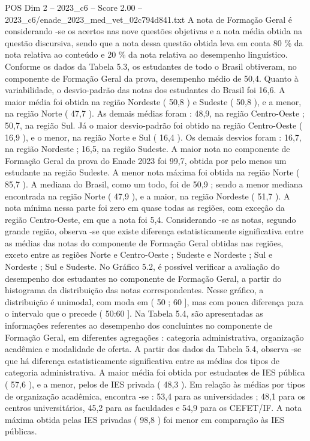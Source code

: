\begin{textsample}{POS Dim 2 – 2023\_c6 – Score 2.00 – 2023\_c6/enade\_2023\_med\_vet\_02c794d841.txt}
A nota de Formação Geral é considerando -se os acertos nas nove questões objetivas e a nota média obtida na questão discursiva, sendo que a nota dessa questão obtida leva em conta 80 \% da nota relativa ao conteúdo e 20 \% da nota relativa ao desempenho linguístico.
Conforme os dados da Tabela 5.3, os estudantes de todo o Brasil obtiveram, no componente de Formação Geral da prova, desempenho médio de 50,4.
Quanto à variabilidade, o desvio-padrão das notas dos estudantes do Brasil foi 16,6.
A maior média foi obtida na região Nordeste ( 50,8 ) e Sudeste ( 50,8 ), e a menor, na região Norte ( 47,7 ).
As demais médias foram : 48,9, na região Centro-Oeste ; 50,7, na região Sul.
Já o maior desvio-padrão foi obtido na região Centro-Oeste ( 16,9 ), e o menor, na região Norte e Sul ( 16,4 ).
Os demais desvios foram : 16,7, na região Nordeste ; 16,5, na região Sudeste.
A maior nota no componente de Formação Geral da prova do Enade 2023 foi 99,7, obtida por pelo menos um estudante na região Sudeste.
A menor nota máxima foi obtida na região Norte ( 85,7 ).
A mediana do Brasil, como um todo, foi de 50,9 ; sendo a menor mediana encontrada na região Norte ( 47,9 ), e a maior, na região Nordeste ( 51,7 ).
A nota mínima nessa parte foi zero em quase todas as regiões, com exceção da região Centro-Oeste, em que a nota foi 5,4.
Considerando -se as notas, segundo grande região, observa -se que existe diferença estatisticamente significativa entre as médias das notas do componente de Formação Geral obtidas nas regiões, exceto entre as regiões Norte e Centro-Oeste ; Sudeste e Nordeste ; Sul e Nordeste ; Sul e Sudeste.
No Gráfico 5.2, é possível verificar a avaliação do desempenho dos estudantes no componente de Formação Geral, a partir do histograma da distribuição das notas correspondentes.
Nesse gráfico, a distribuição é unimodal, com moda em ( 50 ; 60 ], mas com pouca diferença para o intervalo que o precede ( 50:60 ].
Na Tabela 5.4, são apresentadas as informações referentes ao desempenho dos concluintes no componente de Formação Geral, em diferentes agregações : categoria administrativa, organização acadêmica e modalidade de oferta.
A partir dos dados da Tabela 5.4, observa -se que há diferença estatisticamente significativa entre as médias dos tipos de categoria administrativa.
A maior média foi obtida por estudantes de IES pública ( 57,6 ), e a menor, pelos de IES privada ( 48,3 ).
Em relação às médias por tipos de organização acadêmica, encontra -se : 53,4 para as universidades ; 48,1 para os centros universitários, 45,2 para as faculdades e 54,9 para os CEFET/IF.
A nota máxima obtida pelas IES privadas ( 98,8 ) foi menor em comparação às IES públicas.

\end{textsample}
